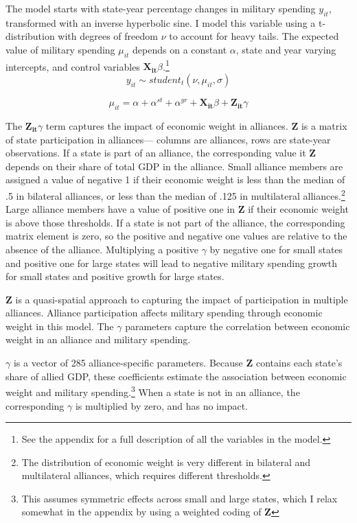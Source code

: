 \documentclass[12pt]{article}
\begin{document}
The model starts with state-year percentage changes in military spending $y_{it}$, transformed with an inverse hyperbolic sine.
I model this variable using a t-distribution with degrees of freedom $\nu$ to account for heavy tails.
The expected value of military spending $\mu_{it}$ depends on a constant $\alpha$, state and year varying intercepts, and control variables $\mathbf{X_{it}} \beta$.\footnote{See the appendix for a full description of all the variables in the model.} 
\begin{equation}
y_{it} \sim student_t(\nu, \mu_{it}, \sigma) 
\end{equation}

\begin{equation}
\mu_{it} = \alpha + \alpha^{st} + \alpha^{yr} + \mathbf{X_{it}} \beta + \mathbf{Z_{it}} \gamma
\end{equation}


The $\mathbf{Z_{it}} \gamma$ term captures the impact of economic weight in alliances.  
$\textbf{Z}$ is a matrix of state participation in alliances--- columns are alliances, rows are state-year observations.  
If a state is part of an alliance, the corresponding value it $\textbf{Z}$ depends on their share of total GDP in the alliance. 
Small alliance members are assigned a value of negative 1 if their economic weight is less than the median of .5 in bilateral alliances, or less than the median of .125 in multilateral alliances.\footnote{The distribution of economic weight is very different in bilateral and multilateral alliances, which requires different thresholds.}
Large alliance members have a value of positive one in $\textbf{Z}$ if their economic weight is above those thresholds. 
If a state is not part of the alliance, the corresponding matrix element is zero, so the positive and negative one values are relative to the absence of the alliance. 
Multiplying a positive $\gamma$ by negative one for small states and positive one for large states will lead to negative military spending growth for small states and positive growth for large states. 


$\textbf{Z}$ is a quasi-spatial approach to capturing the impact of participation in multiple alliances.
Alliance participation affects military spending through economic weight in this model.  
The $\gamma$ parameters capture the correlation between economic weight in an alliance and military spending. 


$\gamma$ is a vector of 285 alliance-specific parameters.  
Because \textbf{Z} contains each state's share of allied GDP, these coefficients estimate the association between economic weight and military spending.\footnote{This assumes symmetric effects across small and large states, which I relax somewhat in the appendix by using a weighted coding of $\textbf{Z}$} 
When a state is not in an alliance, the corresponding $\gamma$ is multiplied by zero, and has no impact. 
\end{document}
